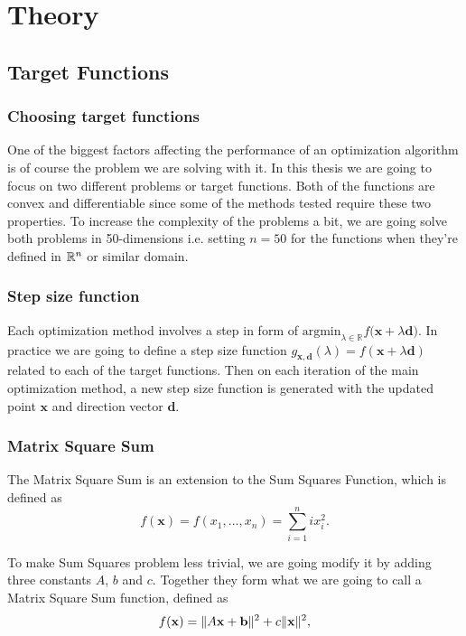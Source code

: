 \documentclass[a4paper,english,titlepage,12pt]{article}
\newcommand{\vect}[1]{\ensuremath{\mathbf{#1}}}
\newcommand{\norm}[1]{\ensuremath\Vert #1 \Vert}
\newcommand{\R}{\ensuremath\mathbb{R}}
\begin{document}
\section{Theory}


\subsection{Target Functions}


\subsubsection{Choosing target functions}


One of the biggest factors affecting the performance of an optimization algorithm is of course the problem we are solving with it. In this thesis we are going to focus on two different problems or target functions. Both of the functions are convex and differentiable since some of the methods tested require these two properties. To increase the complexity of the problems a bit, we are going solve both problems in 50-dimensions i.e. setting $n = 50$ for the functions when they're defined in $\R^n$ or similar domain.


\subsubsection{Step size function}


Each optimization method involves a step in form of $\mathrm{argmin}_{\lambda \in \mathbb{R}} {f(\vect{x} + \lambda \vect{d}})$. In practice we are going to define a step size function $g_{\vect{x}, \vect{d}}(\lambda) = f(\vect{x} + \lambda \vect{d})$ related to each of the target functions. Then on each iteration of the main optimization method, a new step size function is generated with the updated point $\vect{x}$ and direction vector $\vect{d}$.


\subsubsection{Matrix Square Sum} \label{sect:matrix_square_sum}


The Matrix Square Sum is an extension to the Sum Squares Function, which is defined as
\begin{equation}
    f(\mathbf{x})=f(x_1, ..., x_n)=\sum_{i=1}^{n}{ix_i^2}.
\end{equation}

To make Sum Squares problem less trivial, we are going modify it by adding three constants $A$, $b$ and $c$. Together they form what we are going to call a Matrix Square Sum function, defined as
\begin{equation}
    f(\vect{x}) = \norm{A \vect{x} + \vect{b}} ^ 2 + c \norm{\vect{x}} ^ 2,
\end{equation}
\end{document}
